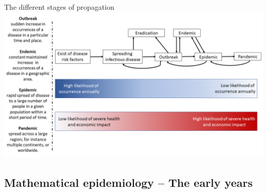 \documentclass[aspectratio=169]{beamer}\usepackage[]{graphicx}\usepackage[]{xcolor}
\begin{document}
\begin{frame}{The different stages of propagation}
        \includegraphics[width=\textwidth]{FIGS/Difference_between_outbreak,_endemic,_epidemic_and_pandemic-en.png}
\end{frame}
        

\subsection{Mathematical epidemiology -- The early years}
\end{document}
